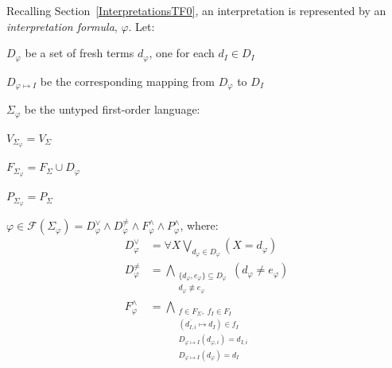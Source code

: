 \documentclass{easychair}
\newenvironment{packed_itemize}{
\vspace*{-0.2em}
\begin{itemize}
\setlength{\partopsep}{0pt}
\setlength{\itemsep}{1pt}
\setlength{\parskip}{0pt}
\setlength{\parsep}{0pt}
}{\end{itemize}}
\begin{document}
\newpage
\noindent
Recalling Section~\ref{InterpretationsTF0}, an interpretation is represented by an 
{\em interpretation formula}, $\varphi$.
Let:
\begin{packed_itemize}
\item $D_{\varphi}$ be a set of fresh terms $d_{\varphi}$, one for each $d_I \in D_I$
\item $D_{\varphi \mapsto I}$ be the corresponding mapping from $D_{\varphi}$ to $D_I$
\item $\Sigma_{\varphi}$ be the untyped first-order language:
      \begin{packed_itemize}
      \item $V_{\Sigma_{\varphi}} = V_\Sigma$
      \item $F_{\Sigma_{\varphi}} = F_\Sigma \cup D_{\varphi}$
      \item $P_{\Sigma_{\varphi}} = P_\Sigma$
      \end{packed_itemize}
\item $\varphi \in \mathcal{F}(\Sigma_{\varphi}) = 
D^\vee_{\varphi} \land D^{\neq}_{\varphi} \land F^\wedge_{\varphi} \land 
P^\wedge_{\varphi}$, where:
\begin{equation*}
\begin{split}
D^\vee_{\varphi}   &= \forall X \bigvee_{d_{\varphi} \in D_{\varphi}} \left(X = d_{\varphi} \right) \\
D^{\neq}_{\varphi} &= \bigwedge_{\substack{\{d_{\varphi},e_{\varphi}\} \subseteq D_{\varphi} \\
                                           d_{\varphi} \not\equiv e_{\varphi}}} \left(d_{\varphi} \neq e_{\varphi} \right) \\
F^\wedge_{\varphi} &= \bigwedge_{\substack{f \in F_\Sigma,\;f_I \in F_I \\
                                           (\overline{d_{I,i}} \mapsto d_I) \in f_I \\
                                           D_{\varphi \mapsto I}(d_{\varphi,i}) = d_{I,i} \\
                                           D_{\varphi \mapsto I}(d_{\varphi}) = d_I}} 

\end{split}
\end{equation*}
\end{packed_itemize}
\end{document}
